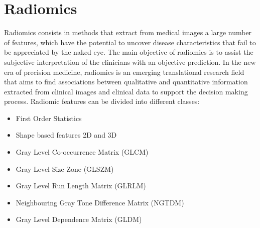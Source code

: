 \documentclass{standalone}
\begin{document}
\section{Radiomics}
Radiomics consists in methods that extract from medical images a large number of features, which have the potential to uncover disease characteristics that fail to be appreciated by the naked eye\cite{wiki:Radiomics}.
The main objective of radiomics is to assist the subjective interpretation of the clinicians with an objective prediction.
In the new era of precision medicine, radiomics is an emerging translational research field that aims to find associations between qualitative and quantitative information extracted from clinical images and clinical data to support the decision making process\cite{tesicoppola}.
Radiomic features can be divided into different classes:
\begin{itemize}
    \item First Order Statistics
    \item Shape based features 2D and 3D
    \item Gray Level Co-occurrence Matrix (GLCM)
    \item Gray Level Size Zone (GLSZM)
    \item Gray Level Run Length Matrix (GLRLM)
    \item Neighbouring Gray Tone Difference Matrix (NGTDM)
    \item Gray Level Dependence Matrix (GLDM)
\end{itemize}
\end{document}
